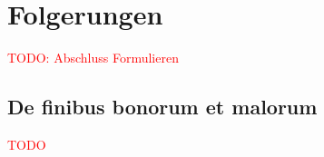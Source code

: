 %
%
%
\section{Folgerungen
\label{quadratur:section:folgerungen}}
\textcolor{red}{TODO: Abschluss Formulieren}

\subsection{De finibus bonorum et malorum
\label{quadratur:subsection:malorum}}
\textcolor{red}{TODO}


